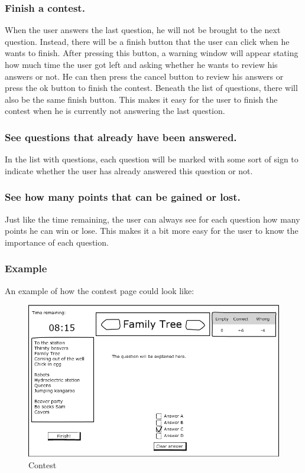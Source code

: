 \subsubsection*{Finish a contest.} 
When the user answers the last question, he will not be brought to the next question. Instead, there will be a finish button that the user can click when he wants to finish. After pressing this button, a warning window will appear stating how much time the user got left and asking whether he wants to review his answers or not. He can then press the cancel button to review his answers or press the ok button to finish the contest. Beneath the list of questions, there will also be the same finish button. This makes it easy for the user to finish the contest when he is currently not answering the last question. 

\subsubsection*{See questions that already have been answered.} 
In the list with questions, each question will be marked with some sort of sign to indicate whether the user has already answered this question or not. 

\subsubsection*{See how many points that can be gained or lost.}
Just like the time remaining, the user can always see for each question how many points he can win or lose. This makes it a bit more easy for the user to know the importance of each question. 

\subsubsection*{Example}
An example of how the contest page could look like: 
		\begin{figure}[h]
		  \centering
			\includegraphics[width=1\textwidth]{img/contests.png}
		  \caption{Contest}
		  \label{Contest}
		\end{figure}

